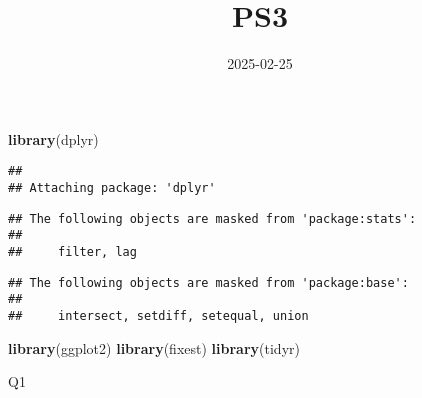 \documentclass[
]{article}
\title{PS3}
\author{}
\date{\vspace{-2.5em}2025-02-25}
\newenvironment{Shaded}{\begin{snugshade}}{\end{snugshade}}
\newcommand{\FunctionTok}[1]{\textcolor[rgb]{0.13,0.29,0.53}{\textbf{#1}}}
\newcommand{\NormalTok}[1]{#1}
\begin{document}
\maketitle

\begin{Shaded}
\begin{Highlighting}[]
\FunctionTok{library}\NormalTok{(dplyr)}
\end{Highlighting}
\end{Shaded}

\begin{verbatim}
## 
## Attaching package: 'dplyr'
\end{verbatim}

\begin{verbatim}
## The following objects are masked from 'package:stats':
## 
##     filter, lag
\end{verbatim}

\begin{verbatim}
## The following objects are masked from 'package:base':
## 
##     intersect, setdiff, setequal, union
\end{verbatim}

\begin{Shaded}
\begin{Highlighting}[]
\FunctionTok{library}\NormalTok{(ggplot2)}
\FunctionTok{library}\NormalTok{(fixest)}
\FunctionTok{library}\NormalTok{(tidyr)}
\end{Highlighting}
\end{Shaded}

Q1
\end{document}
